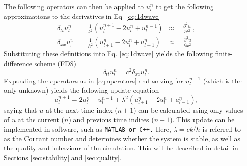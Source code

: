 \documentclass[dvipsnames, reprint]{JASA}
\def\SWcomment[#1]{\textcolor{Bittersweet}{#1}}
\begin{document}
The following operators can then be applied to $u_l^n$ to get the following approximations to the derivatives in Eq. \eqref{eq:1dwave}
\begin{subequations}\label{eq:operators}
    \begin{align}
         \delta_{tt}u_l^n &= \frac{1}{k^2}\left(u_l^{n+1}-2u_l^n + u_l^{n-1}\right)\;\;\approx\quad\frac{\partial^2u}{\partial t^2}\label{eq:secondOrderTime}\ ,\\
         \delta_{xx}u_l^n &= \frac{1}{h^2}\left(u_{l+1}^n-2u_l^n + u_{l-1}^n\right)\quad\approx\quad \frac{\partial^2u}{\partial x^2}\ .\label{eq:secondOrderSpace}
    \end{align}
\end{subequations}
Substituting these definitions into Eq. \eqref{eq:1dwave} yields the following finite-difference scheme (FDS)
\begin{equation}\label{eq:FDS}
    \delta_{tt}u_l^n = c^2 \delta_{xx}u_l^n.
\end{equation}
Expanding the operators as in %
\eqref{eq:operators} and solving for $u_l^{n+1}$ (which is the only unknown) yields the following update equation
\begin{equation}\label{eq:updateEq}
    u_l^{n+1} = 2u_l^n-u_l^{n-1} + \lambda^2 \left(u_{l+1}^n-2u_l^n + u_{l-1}^n\right),
\end{equation}
saying that $u$ at the next time index ($n+1$) can be calculated using only values of $u$ at the current ($n$) and previous time indices ($n-1$). \SWcomment[This update can be implemented in software, such as {\tt MATLAB} or {\tt C++}.] Here, $\lambda = ck/h$ is referred to as the Courant number and determines whether the system is stable, as well as the quality and behaviour of the simulation. This will be described in detail in Sections \ref{sec:stability} and \ref{sec:quality}.
\end{document}
